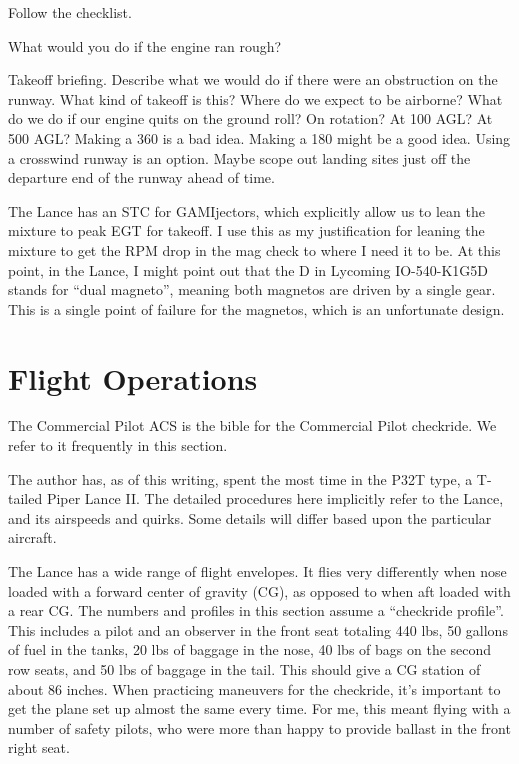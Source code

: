 Follow the checklist.

What would you do if the engine ran rough?

Takeoff briefing. Describe what we would do if there were an obstruction on the runway. What kind of takeoff is this? Where do we expect to be airborne? What do we do if our engine quits on the ground roll? On rotation? At 100 AGL? At 500 AGL? Making a 360 is a bad idea. Making a 180 might be a good idea. Using a crosswind runway is an option. Maybe scope out landing sites just off the departure end of the runway ahead of time.

The Lance has an STC for GAMIjectors, which explicitly allow us to lean the mixture to peak EGT for takeoff. I use this as my justification for leaning the mixture to get the RPM drop in the mag check to where I need it to be. At this point, in the Lance, I might point out that the D in Lycoming IO-540-K1G5D stands for ``dual magneto'', meaning both magnetos are driven by a single gear. This is a single point of failure for the magnetos, which is an unfortunate design.

\section{Flight Operations}

The Commercial Pilot ACS \cite{acs-commercial} is the bible for the Commercial Pilot checkride. We refer to it frequently in this section.

The author has, as of this writing, spent the most time in the P32T type, a T-tailed Piper Lance II. The detailed procedures here implicitly refer to the Lance, and its airspeeds and quirks. Some details will differ based upon the particular aircraft.

The Lance has a wide range of flight envelopes. It flies very differently when nose loaded with a forward center of gravity (CG), as opposed to when aft loaded with a rear CG. The numbers and profiles in this section assume a ``checkride profile''. This includes a pilot and an observer in the front seat totaling 440 lbs, 50 gallons of fuel in the tanks, 20 lbs of baggage in the nose, 40 lbs of bags on the second row seats, and 50 lbs of baggage in the tail. This should give a CG station of about 86 inches. When practicing maneuvers for the checkride, it's important to get the plane set up almost the same every time. For me, this meant flying with a number of safety pilots, who were more than happy to provide ballast in the front right seat.

